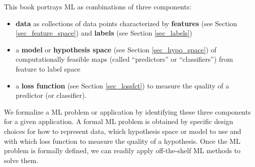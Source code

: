 \documentclass[12pt]{report}
\begin{document}
%
%
%
This book portrays ML as combinations of three components: 
\begin{itemize}
	\item {\bf data} as collections of data points characterized by 
	{\bf features} (see Section \ref{sec_feature_space}) and {\bf labels} 
	(see Section \ref{sec_labels}) 
	\item a {\bf model} or {\bf hypothesis space} (see Section \ref{sec_hypo_space}) 
	of computationally feasible maps (called ``predictors'' or ``classifiers'') 
	from feature to label space 
	\item a {\bf loss function} (see Section \ref{sec_lossfct}) to measure 
	the quality of a predictor (or classifier). 
\end{itemize}
We formalize a ML problem or application by identifying these three 
components for a given application. A formal ML problem is obtained 
by specific design choices for how to represent data, which hypothesis 
space or model to use and with which loss function to measure the 
quality of a hypothesis. Once the ML problem is formally defined, 
we can readily apply off-the-shelf ML methods to solve them. 
\end{document}
